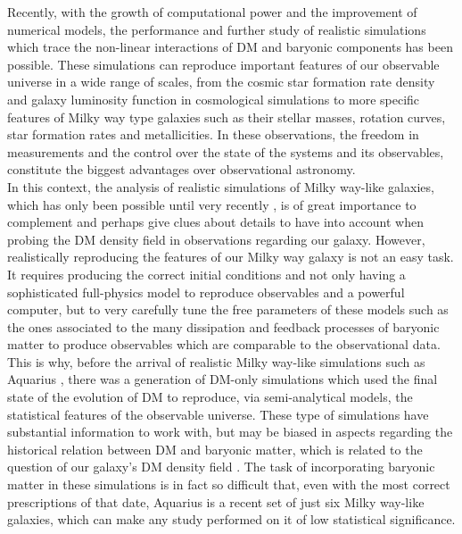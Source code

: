 \documentclass[12pt]{article}
\begin{document}
Recently, with the growth of computational power and the improvement of numerical models, the performance and further study of realistic simulations which trace the non-linear interactions of DM and baryonic components has been possible. These simulations can reproduce important features of our observable universe in a wide range of scales, from the cosmic star formation rate density and galaxy luminosity function in cosmological simulations to more specific features of Milky way type galaxies such as their stellar masses, rotation curves, star formation rates and metallicities. In these observations, the freedom in measurements and the control over the state of the systems and its observables, constitute the biggest advantages over observational astronomy.\\

In this context, the analysis of realistic simulations of Milky way-like galaxies, which has only been possible until very recently \cite{aquarius}, is of great importance to complement and perhaps give clues about details to have into account when probing the DM density field in observations regarding our galaxy. However, realistically reproducing the features of our Milky way galaxy is not an easy task. It requires producing the correct initial conditions and not only having a sophisticated full-physics model to reproduce observables and a powerful computer, but to very carefully tune the free parameters of these models such as the ones associated to the many dissipation and feedback processes of baryonic matter to produce observables which are comparable to the observational data. This is why, before the arrival of realistic Milky way-like simulations such as Aquarius \cite{aquarius}, there was a generation of DM-only simulations which used the final state of the evolution of DM to reproduce, via semi-analytical models, the statistical features of the observable universe. These type of simulations have substantial information to work with, but may be biased in aspects regarding the historical relation between DM and baryonic matter, which is related to the question of our galaxy's DM density field \cite{relation DM baryons is important}. The task of incorporating baryonic matter in these simulations is in fact so difficult that, even with the most correct prescriptions of that date, Aquarius is a recent set of just six Milky way-like galaxies, which can make any study performed on it of low statistical significance.\\
\end{document}
